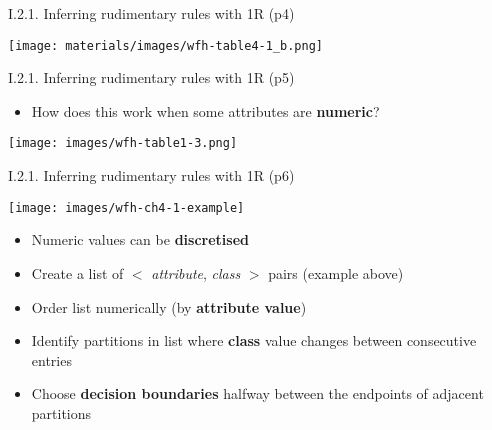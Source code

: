 \documentclass[handout]{beamer}
\newcommand{\strong}[1]{\textbf{\color{teal} #1}}
\newcommand{\stronger}[1]{\textbf{\color{purple} #1}}
\begin{document}
\begin{frame}{I.2.1. Inferring rudimentary rules with 1R (p4)}
\begin{center}
\texttt{[image: materials/images/wfh-table4-1\_b.png]}\\
\cite[Table 4.1]{WFH3:2011}
\end{center}
\end{frame}
\begin{frame}{I.2.1. Inferring rudimentary rules with 1R (p5)}
\begin{itemize}
\item How does this work when some attributes are \strong{numeric}?
\end{itemize}
\begin{center}
\texttt{[image: images/wfh-table1-3.png]}\\
\cite[Table 1.3]{WFH3:2011}
\end{center}
\end{frame}
\begin{frame}{I.2.1. Inferring rudimentary rules with 1R (p6)}
\begin{center}
\texttt{[image: images/wfh-ch4-1-example]}\\
\cite[ch 4.1]{WFH3:2011}
\end{center}
\begin{itemize}
\item Numeric values can be \stronger{discretised}
\item Create a list of $<$ \emph{attribute}, \emph{class} $>$ pairs (example above)
\item Order list numerically (by \strong{attribute value})
\item Identify partitions in list where \strong{class} value changes between consecutive entries
\item Choose \stronger{decision boundaries} halfway between the endpoints of adjacent partitions
\end{itemize}
\end{frame}
\end{document}
